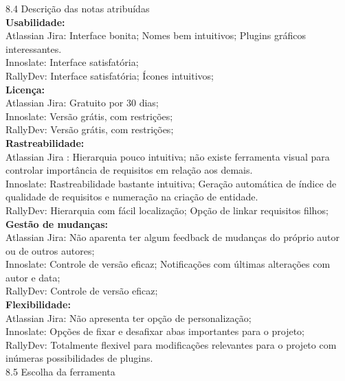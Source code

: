 {\large{8.4 Descrição das notas atribuídas}}\\

\textbf{Usabilidade:}\\
	\tab Atlassian Jira: Interface bonita; Nomes bem intuitivos; Plugins gráficos interessantes.\\
	\tab Innoslate: Interface satisfatória; \\
	\tab RallyDev: Interface satisfatória; Ícones intuitivos;\\

\textbf{Licença:}\\
	\tab Atlassian Jira: Gratuito por 30 dias;\\
	\tab Innoslate: Versão grátis, com restrições;\\
	\tab RallyDev: Versão grátis, com restrições;\\

\textbf{Rastreabilidade:}\\
	\tab Atlassian Jira : Hierarquia pouco intuitiva; não existe ferramenta visual para controlar importância de requisitos em relação aos demais.\\
	\tab Innoslate: Rastreabilidade bastante intuitiva; Geração automática de índice de qualidade de requisitos e numeração na criação de entidade.\\
	\tab RallyDev: Hierarquia com fácil localização; Opção de linkar requisitos filhos;\\

\textbf{Gestão de mudanças:}\\
	\tab Atlassian Jira: Não aparenta ter algum feedback de mudanças do próprio autor ou de outros autores;\\
	\tab Innoslate: Controle de versão eficaz; Notificações com últimas alterações com autor e data;\\
	\tab RallyDev: Controle de versão eficaz;\\

\textbf{Flexibilidade:} \\
	\tab Atlassian Jira: Não apresenta ter opção de personalização;\\
	\tab Innoslate: Opções de fixar e desafixar abas importantes para o projeto;\\
	\tab RallyDev: Totalmente flexivel para modificações relevantes para o projeto com inúmeras possibilidades de plugins.\\

{\large{8.5 Escolha da ferramenta}}\\

